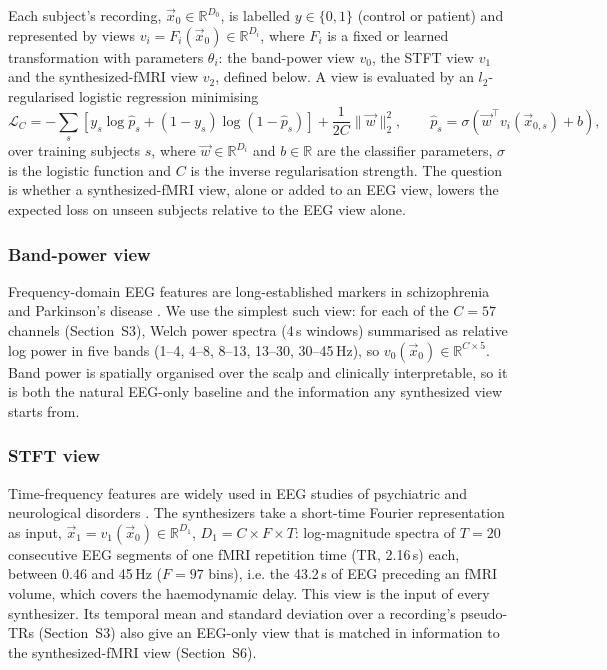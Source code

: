 \documentclass[10pt]{article}
\begin{document}
Each subject's recording, $\vec{x}_0 \in \mathbb{R}^{D_0}$, is labelled $y \in \{0,1\}$ (control or patient) and represented by views $v_i = F_i(\vec{x}_0) \in \mathbb{R}^{D_i}$, where $F_i$ is a fixed or learned transformation with parameters $\theta_i$: the band-power view $v_0$, the STFT view $v_1$ and the synthesized-fMRI view $v_2$, defined below. A view is evaluated by an $l_2$-regularised logistic regression minimising
\begin{equation}\label{equation:loss}
    \mathcal{L}_C = -\sum_{s} \left[ y_s \log \hat{p}_s + (1-y_s) \log(1-\hat{p}_s) \right] + \frac{1}{2C}\|\vec{w}\|_2^2, \qquad \hat{p}_s = \sigma\!\left(\vec{w}^\top v_i(\vec{x}_{0,s}) + b\right),
\end{equation}
over training subjects $s$, where $\vec{w} \in \mathbb{R}^{D_i}$ and $b \in \mathbb{R}$ are the classifier parameters, $\sigma$ is the logistic function and $C$ is the inverse regularisation strength. The question is whether a synthesized-fMRI view, alone or added to an EEG view, lowers the expected loss on unseen subjects relative to the EEG view alone.

\subsubsection{Band-power view}\label{eeg_views:bandpower}

Frequency-domain EEG features are long-established markers in schizophrenia and Parkinson's disease \cite{itil1977qualitative,roach2008event,bates2009low,barros2021advanced}. We use the simplest such view: for each of the $C=57$ channels (Section~S3), Welch power spectra (4\,s windows) summarised as relative log power in five bands (1--4, 4--8, 8--13, 13--30, 30--45\,Hz), so $v_0(\vec{x}_0) \in \mathbb{R}^{C\times5}$. Band power is spatially organised over the scalp and clinically interpretable, so it is both the natural EEG-only baseline and the information any synthesized view starts from.

\subsubsection{STFT view}\label{eeg_views:channel_freq_time}

Time-frequency features are widely used in EEG studies of psychiatric and neurological disorders \cite{fingelkurts2007impaired,burgess2002functional,albrecht2018time,roach2008event,bates2009low}. The synthesizers take a short-time Fourier representation \cite{jacobsen2003sliding} as input, $\vec{x}_1 = v_1(\vec{x}_0) \in \mathbb{R}^{D_1}$, $D_1 = C \times F \times T$: log-magnitude spectra of $T=20$ consecutive EEG segments of one fMRI repetition time (TR, 2.16\,s) each, between 0.46 and 45\,Hz ($F=97$ bins), i.e. the 43.2\,s of EEG preceding an fMRI volume, which covers the haemodynamic delay. This view is the input of every synthesizer. Its temporal mean and standard deviation over a recording's pseudo-TRs (Section~S3) also give an EEG-only view that is matched in information to the synthesized-fMRI view (Section~S6).
\end{document}
